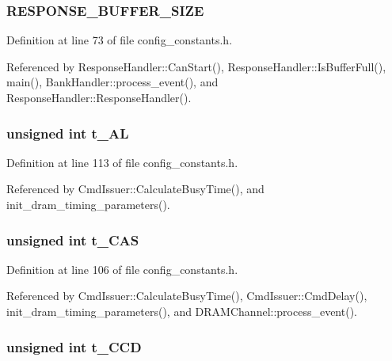 \subsubsection[{RESPONSE\_\-BUFFER\_\-SIZE}]{ {\bf RESPONSE\_\-BUFFER\_\-SIZE}}\label{mc__constants_8h_15d2d426c9f48f49b5b35c3953238331}




Definition at line 73 of file config\_\-constants.h.

Referenced by ResponseHandler::CanStart(), ResponseHandler::IsBufferFull(), main(), BankHandler::process\_\-event(), and ResponseHandler::ResponseHandler().
\subsubsection[{t\_\-AL}]{\setlength{\rightskip}{0pt plus 5cm}unsigned int {\bf t\_\-AL}}\label{mc__constants_8h_66638020e5d6dcd8d47edc87f7fdd72f}




Definition at line 113 of file config\_\-constants.h.

Referenced by CmdIssuer::CalculateBusyTime(), and init\_\-dram\_\-timing\_\-parameters().
\subsubsection[{t\_\-CAS}]{\setlength{\rightskip}{0pt plus 5cm}unsigned int {\bf t\_\-CAS}}\label{mc__constants_8h_1330e29f26622acc66128573058e6a1a}




Definition at line 106 of file config\_\-constants.h.

Referenced by CmdIssuer::CalculateBusyTime(), CmdIssuer::CmdDelay(), init\_\-dram\_\-timing\_\-parameters(), and DRAMChannel::process\_\-event().
\subsubsection[{t\_\-CCD}]{\setlength{\rightskip}{0pt plus 5cm}unsigned int {\bf t\_\-CCD}}\label{mc__constants_8h_6c24c1c910a636fc9a4be156ed38db6d}




